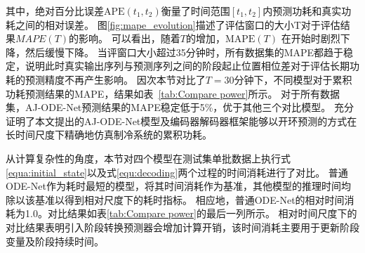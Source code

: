 其中，绝对百分比误差$\text{APE}(t_1,t_2)$衡量了时间范围$[t_1, t_2]$内预测功耗和真实功耗之间的相对误差。
图\ref{fig:mape_evolution}描述了评估窗口的大小T对于评估结果$MAPE(T)$的影响。
可以看出，随着$T$的增加，$\text{MAPE}(T)$ 在开始时剧烈下降，然后缓慢下降。
当评窗口大小超过35分钟时，所有数据集的MAPE都趋于稳定，说明此时真实输出序列与预测序列之间的阶段起止位置相位差对于评估长期功耗的预测精度不再产生影响。
因次本节对比了$T=30$分钟下，不同模型对于累积功耗预测结果的MAPE，结果如表~\ref{tab:Compare power}所示。
对于所有数据集，AJ-ODE-Net预测结果的MAPE稳定低于5\%，优于其他三个对比模型。
充分证明了本文提出的AJ-ODE-Net模型及编码器解码器框架能够以开环预测的方式在长时间尺度下精确地仿真制冷系统的累积功耗。

从计算复杂性的角度，本节对四个模型在测试集单批数据上执行式\eqref{equa:initial_state}以及式\eqref{equ:decoding}两个过程的时间消耗进行了对比。
普通ODE-Net作为耗时最短的模型，将其时间消耗作为基准，其他模型的推理时间均除以该基准以得到相对尺度下的耗时指标。
相应地，普通ODE-Net的相对时间消耗为1.0。对比结果如表\ref{tab:Compare power}的最后一列所示。
相对时间尺度下的对比结果表明引入阶段转换预测器会增加计算开销，该时间消耗主要用于更新阶段变量及阶段持续时间。

